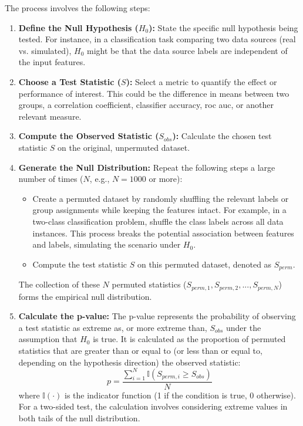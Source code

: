 The process involves the following steps:

\begin{enumerate}
  \item \textbf{Define the Null Hypothesis ($H_0$):} State the specific null hypothesis being tested. For instance, in a classification task comparing two data sources (real vs. simulated), $H_0$ might be that the data source labels are independent of the input features.
  \item \textbf{Choose a Test Statistic ($S$):} Select a metric to quantify the effect or performance of interest. This could be the difference in means between two groups, a correlation coefficient, classifier accuracy, \gls{roc} \gls{auc}, or another relevant measure.
  \item \textbf{Compute the Observed Statistic ($S_{obs}$):} Calculate the chosen test statistic $S$ on the original, unpermuted dataset.
  \item \textbf{Generate the Null Distribution:} Repeat the following steps a large number of times ($N$, e.g., $N=1000$ or more):
        \begin{itemize}
          \item Create a permuted dataset by randomly shuffling the relevant labels or group assignments while keeping the features intact. For example, in a two-class classification problem, shuffle the class labels across all data instances. This process breaks the potential association between features and labels, simulating the scenario under $H_0$.
          \item Compute the test statistic $S$ on this permuted dataset, denoted as $S_{perm}$.
        \end{itemize}
        The collection of these $N$ permuted statistics ($S_{perm, 1}, S_{perm, 2}, ..., S_{perm, N}$) forms the empirical null distribution.
  \item \textbf{Calculate the p-value:} The p-value represents the probability of observing a test statistic as extreme as, or more extreme than, $S_{obs}$ under the assumption that $H_0$ is true. It is calculated as the proportion of permuted statistics that are greater than or equal to (or less than or equal to, depending on the hypothesis direction) the observed statistic:
        \begin{equation}
          p = \frac{\sum_{i=1}^{N} \mathbb{I}(S_{perm, i} \ge S_{obs})}{N}
          \label{eq:pvalue_perm}
        \end{equation}
        where $\mathbb{I}(\cdot)$ is the indicator function (1 if the condition is true, 0 otherwise). For a two-sided test, the calculation involves considering extreme values in both tails of the null distribution.

\end{enumerate}
